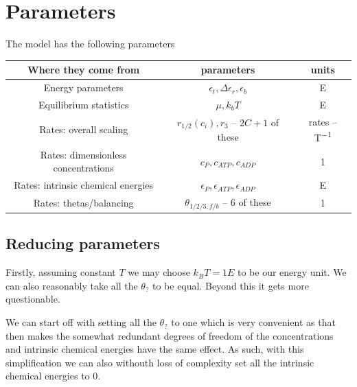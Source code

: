 \documentclass[11pt]{article}
\begin{document}
\section{Parameters}
The model has the following parameters
\begin{table}[H]
    \centering
    \begin{tabular}{c|c|c}
        Where they come from & parameters & units \\
        \hline
        Energy parameters & $\epsilon_t, \Delta\epsilon_r, \epsilon_b$ & \si{E} \\
        Equilibrium statistics & $\mu, \si{k_b}T$ & \si{E} \\
        Rates: overall scaling & $r_{1/2}(c_i),r_3$ -- $2C+1$ of these & rates -- \si{T^{-1}} \\
        Rates: dimensionless concentrations & $c_P,c_{ATP},c_{ADP}$ & \si{1} \\
        Rates: intrinsic chemical energies & $\epsilon_P,\epsilon_{ATP},\epsilon_{ADP}$ & \si{E} \\
        Rates: thetas/balancing & $\theta_{1/2/3,f/b}$ -- 6 of these & \si{1} \\
    \end{tabular}
\end{table}

\subsection{Reducing parameters}\label{sec:redpar}
Firstly, assuming constant $T$ we may choose $\si{k_B}T = 1\si{E}$ to be our energy unit.
We can also reasonably take all the $\theta_?$ to be equal.
Beyond this it gets more questionable.

\begin{tcolorbox}
    We can start off with setting all the $\theta_?$ to one which is very convenient as that then makes the somewhat redundant degrees of freedom of the concentrations and intrinsic chemical energies have the same effect.
    As such, with this simplification we can also withouth loss of complexity set all the intrinsic chemical energies to 0.
\end{tcolorbox}
\end{document}
